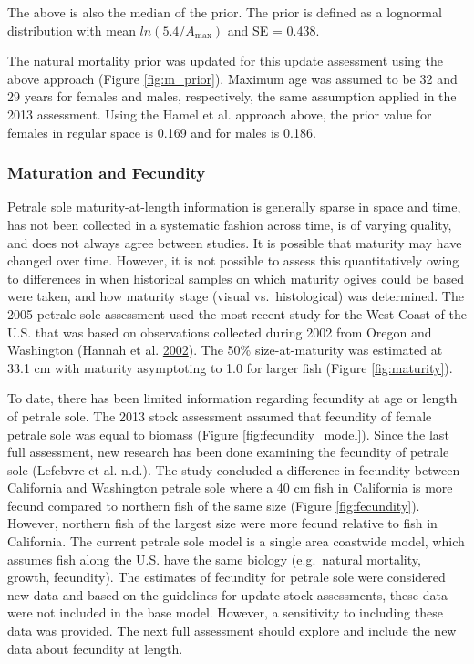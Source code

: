 \documentclass[12pt,]{article}
\begin{document}
The above is also the median of the prior. The prior is defined as a
lognormal distribution with mean \(ln(5.4/A_{\text{max}})\) and SE =
0.438.

The natural mortality prior was updated for this update assessment using
the above approach (Figure \ref{fig:m_prior}). Maximum age was assumed
to be 32 and 29 years for females and males, respectively, the same
assumption applied in the 2013 assessment. Using the Hamel et al.
approach above, the prior value for females in regular space is 0.169
and for males is 0.186.

\subsubsection{Maturation and Fecundity}\label{maturation-and-fecundity}

Petrale sole maturity-at-length information is generally sparse in space
and time, has not been collected in a systematic fashion across time, is
of varying quality, and does not always agree between studies. It is
possible that maturity may have changed over time. However, it is not
possible to assess this quantitatively owing to differences in when
historical samples on which maturity ogives could be based were taken,
and how maturity stage (visual vs.~histological) was determined. The
2005 petrale sole assessment used the most recent study for the West
Coast of the U.S. that was based on observations collected during 2002
from Oregon and Washington (Hannah et al.
\protect\hyperlink{ref-hannah_length_2002}{2002}). The 50\%
size-at-maturity was estimated at 33.1 cm with maturity asymptoting to
1.0 for larger fish (Figure \ref{fig:maturity}).

To date, there has been limited information regarding fecundity at age
or length of petrale sole. The 2013 stock assessment assumed that
fecundity of female petrale sole was equal to biomass (Figure
\ref{fig:fecundity_model}). Since the last full assessment, new research
has been done examining the fecundity of petrale sole (Lefebvre et al.
n.d.). The study concluded a difference in fecundity between California
and Washington petrale sole where a 40 cm fish in California is more
fecund compared to northern fish of the same size (Figure
\ref{fig:fecundity}). However, northern fish of the largest size were
more fecund relative to fish in California. The current petrale sole
model is a single area coastwide model, which assumes fish along the
U.S. have the same biology (e.g.~natural mortality, growth, fecundity).
The estimates of fecundity for petrale sole were considered new data and
based on the guidelines for update stock assessments, these data were
not included in the base model. However, a sensitivity to including
these data was provided. The next full assessment should explore and
include the new data about fecundity at length.
\end{document}
